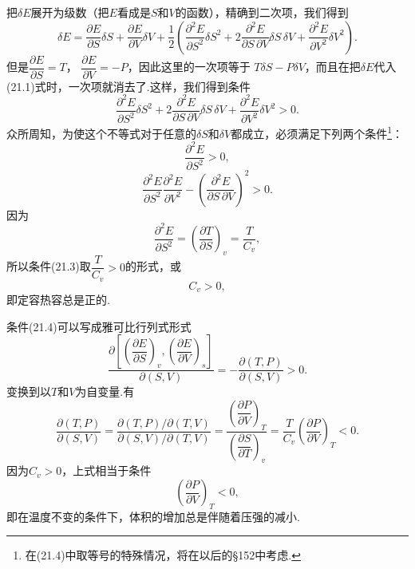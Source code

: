 把$\delta E$展开为级数（把$E$看成是$S$和$V$的函数），精确到二次项，我们得到
\begin{equation*}
  \delta E=\frac{\partial E}{\partial S}\delta S
  +\frac{\partial E}{\partial V}\delta V
  +\frac{1}{2}\left(\frac{\partial^2 E}{\partial S^2}\delta S^2
  +2\frac{\partial^2 E}{\partial S\,\partial V}\delta S\,\delta V
  +\frac{\partial^2 E}{\partial V^2}\delta V^2\right).
\end{equation*}
但是$\dfrac{\partial E}{\partial S}=T$，
$\dfrac{\partial E}{\partial V}=-P$，因此这里的一次项等于
$T\delta S-P\delta V$，而且在把$\delta E$代入(21.1)式时，一次项就消去了.这样，我们得到条件
\begin{equation}
  \frac{\partial^2 E}{\partial S^2}\delta S^2
  +2\frac{\partial^2 E}{\partial S\,\partial V}\delta S\,\delta V
  +\frac{\partial^2 E}{\partial V^2}\delta V^2>0.
\end{equation}
众所周知，为使这个不等式对于任意的$\delta S$和$\delta V$都成立，必须满足下列两个条件\footnote{在(21.4)中取等号的特殊情况，将在以后的§152中考虑.}：
\begin{equation}
  \frac{\partial^2 E}{\partial S^2}>0,
\end{equation}
\begin{equation}
  \frac{\partial^2 E}{\partial S^2}
  \frac{\partial^2 E}{\partial V^2}
  -\left(\frac{\partial^2 E}{\partial S\,\partial V}\right)^2>0.
\end{equation}
因为
\begin{equation*}
  \frac{\partial^2 E}{\partial S^2}
  =\left(\frac{\partial T}{\partial S}\right)_v
  =\frac{T}{C_v},
\end{equation*}
所以条件(21.3)取$\dfrac{T}{C_v}>0$的形式，或
\begin{equation}
  C_v>0,
\end{equation}
即定容热容总是正的.

条件(21.4)可以写成雅可比行列式形式
\begin{equation*}
  \frac{\partial\left[\left(\dfrac{\partial E}{\partial S}\right)_v,
  \left(\dfrac{\partial E}{\partial V}\right)_s\right]}
  {\partial(S,V)}
  =-\frac{\partial(T,P)}{\partial(S,V)}>0.
\end{equation*}
变换到以$T$和$V$为自变量.有
\begin{equation*}
  \frac{\partial(T,P)}{\partial(S,V)}
  =\frac{\partial(T,P)/\partial(T,V)}
  {\partial(S,V)/\partial(T,V)}
  =\frac{\left(\dfrac{\partial P}{\partial V}\right)_T}
  {\left(\dfrac{\partial S}{\partial T}\right)_v}
  =\frac{T}{C_v}\left(\frac{\partial P}{\partial V}\right)_T<0.
\end{equation*}
因为$C_v>0$，上式相当于条件
\begin{equation}
  \left(\frac{\partial P}{\partial V}\right)_T<0,
\end{equation}
即在温度不变的条件下，体积的增加总是伴随着压强的减小.

